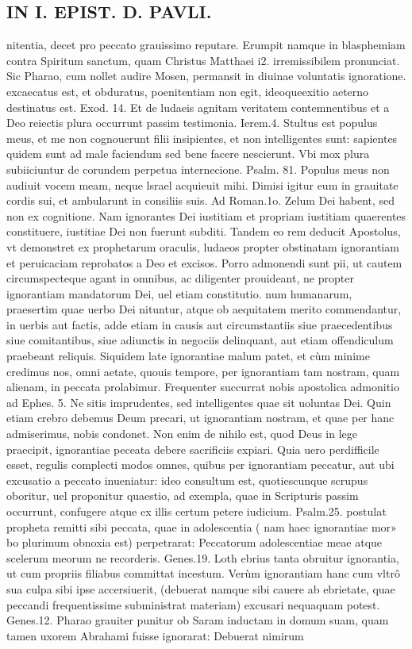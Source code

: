 \documentclass{article}
\begin{document}
\begin{pages}
\section*{IN I. EPIST. D. PAVLI. }
\marginpar{[ p.43 ]}\pstart nitentia, decet pro peccato grauissimo reputare. Erumpit namque in blasphemiam contra Spiritum sanctum, quam Christus Matthaei i2. irremissibilem pronunciat. Sic Pharao, cum nollet audire Mosen, permansit in diuinae voluntatis ignoratione. excaecatus est, et obduratus, poenitentiam non egit, ideoqueexitio aeterno destinatus est. Exod. 14. Et de ludaeis agnitam veritatem contemnentibus et a Deo reiectis plura occurrunt passim testimonia. Ierem.4. Stultus est populus meus, et me   non cognouerunt filii insipientes, et non intelligentes sunt: sapientes quidem sunt ad male faciendum sed bene facere nescierunt. Vbi mox plura subiiciuntur de corundem perpetua internecione. Psalm. 81. Populus meus non audiuit vocem meam,   neque lsrael acquieuit mihi. Dimisi igitur eum in grauitate cordis sui, et ambularunt   in consiliis suis. Ad Roman.1o. Zelum Dei habent, sed non ex cognitione. Nam   ignorantes Dei iustitiam et propriam iustitiam quaerentes constituere, iustitiae Dei   non fuerunt subditi. Tandem eo rem deducit Apostolus, vt demonstret ex prophetarum oraculis, ludaeos propter obstinatam ignorantiam et peruicaciam reprobatos a Deo et excisos.  \pend\pstart Porro admonendi sunt pii, ut cautem circumspecteque  agant in omnibus, ac diligenter prouideant, ne propter ignorantiam mandatorum Dei, uel etiam constitutio. num humanarum, praesertim quae uerbo Dei nituntur, atque ob aequitatem merito commendantur, in uerbis aut factis, adde etiam in causis aut circumstantiis siue praecedentibus siue comitantibus, siue adiunctis in negociis delinquant, aut etiam offendiculum praebeant reliquis. Siquidem late ignorantiae malum patet, et cùm minime credimus nos, omni aetate, quouis tempore, per ignorantiam tam nostram, quam alienam, in peccata prolabimur. Frequenter succurrat nobis apostolica admonitio ad Ephes. 5. Ne sitis imprudentes, sed intelligentes quae sit uoluntas Dei. Quin etiam crebro debemus Deum precari, ut ignorantiam nostram, et quae per hanc admiserimus, nobis condonet. Non enim de nihilo est, quod Deus in lege praecipit, ignorantiae peceata debere sacrificiis expiari.  \pend\pstart Quia uero perdifficile esset, regulis complecti modos omnes, quibus per ignorantiam peccatur, aut ubi excusatio a peccato inueniatur: ideo consultum est, quotiescunque  scrupus oboritur, uel proponitur quaestio, ad exempla, quae in Scripturis passim occurrunt, confugere atque ex illis certum petere iudicium. Psalm.25. postulat propheta remitti sibi peccata, quae in adolescentia ( nam haec ignorantiae mor» bo plurimum obnoxia est) perpetrarat: Peccatorum adolescentiae meae atque scelerum meorum ne recorderis. Genes.19. Loth ebrius tanta obruitur ignorantia, ut cum propriis filiabus committat incestum. Verùm ignorantiam hanc cum vltrô sua culpa sibi ipse accersiuerit, (debuerat namque sibi cauere ab ebrietate, quae peccandi frequentissime subministrat materiam) excusari nequaquam potest. Genes.12. Pharao grauiter punitur ob Saram inductam in domum suam, quam tamen uxorem Abrahami fuisse ignorarat: Debuerat nimirum 
\end{pages}
\end{document}
